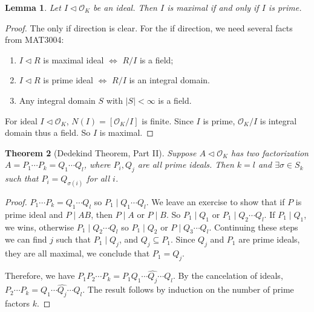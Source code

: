 \documentclass[11pt]{book}
\newtheorem{theorem}{Theorem}[section]
\newtheorem{lemma}[theorem]{Lemma}
\begin{document}
\begin{lemma}
    Let $I\lhd \mathcal{O}_{K}$ be an ideal. Then $I$ is maximal if and only if $I$ is prime. 
\end{lemma}

\begin{proof}
    The only if direction is clear. For the if direction, we need several facts from MAT3004: 
    \begin{enumerate}
        \item $I\lhd R$ is maximal ideal $\iff$ $R /I$ is a field; 
        \item $I\lhd R$ is prime ideal $\iff$ $R /I$ is an integral domain. 
        \item Any integral domain $S$ with $\left| S \right| <\infty$ is a field. 
    \end{enumerate}
    For ideal $I\lhd\mathcal{O}_{K}$, $N(I)= [\mathcal{O}_{K} /I]$ is finite. Since $I$ is prime, $\mathcal{O}_{K} /I$ is integral domain thus a field.  So $I$ is maximal. 
\end{proof}

\begin{theorem}[Dedekind Theorem, Part II]
    Suppose $A\lhd \mathcal{O}_{K}$ has two factorization $A=P_{1}\cdots P_{k}=Q_{1} \cdots Q_{l}$, where $P_{i}, Q_{j}$ are all prime ideals. Then $k=l$ and $\exists \sigma\in S_{k}$ such that $P_{i}=Q_{\sigma(i)}$ for all $i$. 
\end{theorem}

\begin{proof}
    $P_{1}\cdots P_{k}=Q_{1}\cdots Q_{l}$ so $P_{1}\mid Q_{1}\cdots Q_{l}$. We leave an exercise to show that if $P$ is prime ideal and $P\mid AB$, then $P\mid A$ or $P\mid B$. So $P_{1}\mid Q_{1}$ or $P_{1}\mid Q_{2}\cdots Q_{l}$. If $P_{1}\mid Q_{1}$, we wins, otherwise $P_{1}\mid Q_{2}\cdots Q_{l}$ so $P_{1}\mid Q_{2}$ or $P\mid Q_{3}\cdots Q_{l}$. Continuing these steps we can find $j$ such that $P_{1}\mid Q_{j}$, and $Q_{j}\subseteq P_{1}$. Since $Q_{j}$ and $P_{1}$ are prime ideals, they are all maximal, we conclude that $P_{1}=Q_{j}$. 

    Therefore, we have $P_{1}P_{2}\cdots P_{k}=P_{1}Q_{1}\cdots\hat{Q_{j}}\cdots Q_{l}$. By the cancelation of ideals, $P_{2}\cdots P_{k}=Q_{1}\cdots \hat{Q_{j}}\cdots Q_{l}$. The result follows by induction on the number of prime factors $k$. 
\end{proof}
\end{document}
